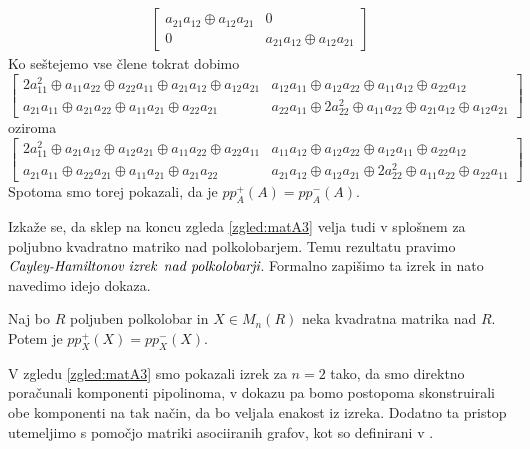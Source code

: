 \documentclass[mat1]{fmfdelo}
\newcommand{\pojem}[1]{\ensuremath{\emph{#1}}}
\begin{document}
\begin{zgled}
\begin{align*}
\begin{bmatrix}
a_{21}a_{12} \oplus a_{12}a_{21} & 0 \\
0 & a_{21}a_{12} \oplus a_{12}a_{21}
\end{bmatrix}
\end{align*}
Ko seštejemo vse člene tokrat dobimo $$\begin{bmatrix}
	2a_{11}^2 \oplus a_{11}a_{22} \oplus a_{22}a_{11} \oplus a_{21}a_{12} \oplus a_{12}a_{21} & a_{12}a_{11} \oplus a_{12}a_{22} \oplus a_{11}a_{12} \oplus a_{22}a_{12} \\
	a_{21}a_{11} \oplus a_{21}a_{22} \oplus a_{11}a_{21} \oplus a_{22}a_{21} & a_{22}a_{11} \oplus 2a_{22}^2 \oplus a_{11}a_{22} \oplus a_{21}a_{12} \oplus a_{12}a_{21}
\end{bmatrix}$$ oziroma $$\begin{bmatrix}
2a_{11}^2 \oplus a_{21}a_{12} \oplus a_{12}a_{21} \oplus a_{11}a_{22} \oplus a_{22}a_{11} & a_{11}a_{12} \oplus a_{12}a_{22} \oplus a_{12}a_{11} \oplus a_{22}a_{12} \\
a_{21}a_{11} \oplus a_{22}a_{21} \oplus a_{11}a_{21} \oplus a_{21}a_{22} & a_{21}a_{12} \oplus a_{12}a_{21} \oplus 2a_{22}^2 \oplus a_{11}a_{22} \oplus a_{22}a_{11}
\end{bmatrix}$$
Spotoma smo torej pokazali, da je $pp_A^{+}(A) = pp_A^{-}(A)$.
\end{zgled}

Izkaže se, da sklep na koncu zgleda \ref{zgled:matA3} velja tudi v splošnem za poljubno kvadratno matriko nad polkolobarjem. Temu rezultatu pravimo \pojem{Cayley-Hamiltonov izrek} \pojem{nad polkolobarji}. Formalno zapišimo ta izrek in nato navedimo idejo dokaza.

\begin{izrek}
	Naj bo $R$ poljuben polkolobar in $X\in M_n(R)$ neka kvadratna matrika nad $R$. Potem je $pp_X^{+}(X) = pp_X^{-}(X)$.
\end{izrek}

V zgledu \ref{zgled:matA3} smo pokazali izrek za $n = 2$ tako, da smo direktno poračunali komponenti pipolinoma, v dokazu pa bomo postopoma skonstruirali obe komponenti na tak način, da bo veljala enakost iz izreka. Dodatno ta pristop utemeljimo s pomočjo matriki asociiranih grafov, kot so definirani v \cite[poglavje 4]{bib:Grosu}.
\end{document}
